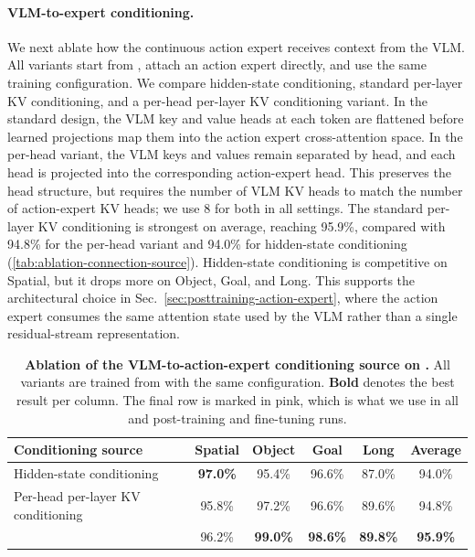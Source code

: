 \paragraph{VLM-to-expert conditioning.}
We next ablate how the continuous action expert receives context from the VLM.
All variants start from \molmoacttpre, attach an action expert directly, and
use the same \libero training configuration. We compare hidden-state
conditioning, standard per-layer KV conditioning, and a per-head
per-layer KV conditioning variant. In the standard design, the VLM key and value heads at
each token are flattened before learned projections map them into the action
expert cross-attention space. In the per-head variant, the VLM keys and values remain
separated by head, and each head is projected into the corresponding
action-expert head. This preserves the head structure, but requires the number
of VLM KV heads to match the number of action-expert KV heads; we use 8 for
both in all settings. The standard per-layer KV conditioning is strongest on
average, reaching 95.9\%, compared with 94.8\% for the per-head variant and
94.0\% for hidden-state conditioning
(\autoref{tab:ablation-connection-source}).
Hidden-state conditioning is competitive on Spatial, but it drops more on
Object, Goal, and Long. This supports the architectural choice in
Sec.~\ref{sec:posttraining-action-expert}, where the action expert consumes the
same attention state used by the VLM rather than a single residual-stream
representation.

\begin{table}[h]
\centering
\caption{\textbf{Ablation of the VLM-to-action-expert conditioning source on
\libero.} All variants are trained from \molmoacttpre with the same
configuration. \textbf{Bold} denotes the best result per column. The final row is marked in pink, which is what we use in all \molmoactt and \molmothink post-training and fine-tuning runs.}
\begin{tabular}{lccccc}
\textbf{Conditioning source} & \textbf{Spatial} & \textbf{Object} & \textbf{Goal} & \textbf{Long} & \textbf{Average} \\
\midrule
Hidden-state conditioning & \textbf{97.0\%} & 95.4\% & 96.6\% & 87.0\% & 94.0\% \\
Per-head per-layer KV conditioning & 95.8\% & 97.2\% & 96.6\% & 89.6\% & 94.8\% \\
\color{ai2pink}{Per-layer KV conditioning} & 96.2\% & \textbf{99.0\%} & \textbf{98.6\%} & \textbf{89.8\%} & \textbf{95.9\%} \\
\end{tabular}
\label{tab:ablation-connection-source}
\end{table}

